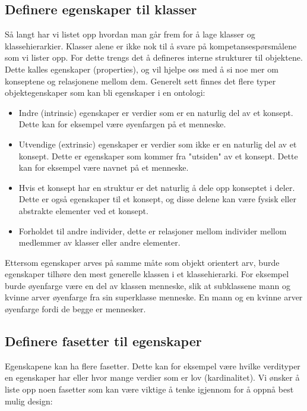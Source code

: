 \subsection{Definere egenskaper til klasser}
Så langt har vi listet opp hvordan man går frem for å lage klasser og klassehierarkier. Klasser alene er ikke nok til å svare på kompetansespørsmålene som vi lister opp. For dette trengs det å defineres interne strukturer til objektene. Dette kalles egenskaper (properties), og vil hjelpe oss med å si noe mer om konseptene og relasjonene mellom dem.
Generelt sett finnes det flere typer objektegenskaper som kan bli egenskaper i en ontologi:
\begin{itemize}
\item Indre (intrinsic) egenskaper er verdier som er en naturlig del av et konsept. Dette kan for eksempel være øyenfargen på et menneske.
\item Utvendige (extrinsic) egenskaper er verdier som ikke er en naturlig del av et konsept. Dette er egenskaper som kommer fra "utsiden" av et konsept. Dette kan for eksempel være navnet på et menneske.
\item Hvis et konsept har en struktur er det naturlig å dele opp konseptet i deler. Dette er også egenskaper til et konsept, og disse delene kan være fysisk eller abstrakte elementer ved et konsept.
\item Forholdet til andre individer, dette er relasjoner mellom individer mellom medlemmer av klasser eller andre elementer.
\end{itemize}
Ettersom egenskaper arves på samme måte som objekt orientert arv, burde egenskaper tilhøre den mest generelle klassen i et klassehierarki. For eksempel burde øyenfarge være en del av klassen menneske, slik at subklassene mann og kvinne arver øyenfarge fra sin superklasse menneske. En mann og en kvinne arver øyenfarge fordi de begge er mennesker.

\subsection{Definere fasetter til egenskaper}
Egenskapene kan ha flere fasetter. Dette kan for eksempel være hvilke verdityper en egenskaper har eller hvor mange verdier som er lov (kardinalitet). Vi ønsker å liste opp noen fasetter som kan være viktige å tenke igjennom for å oppnå best mulig design: \\

